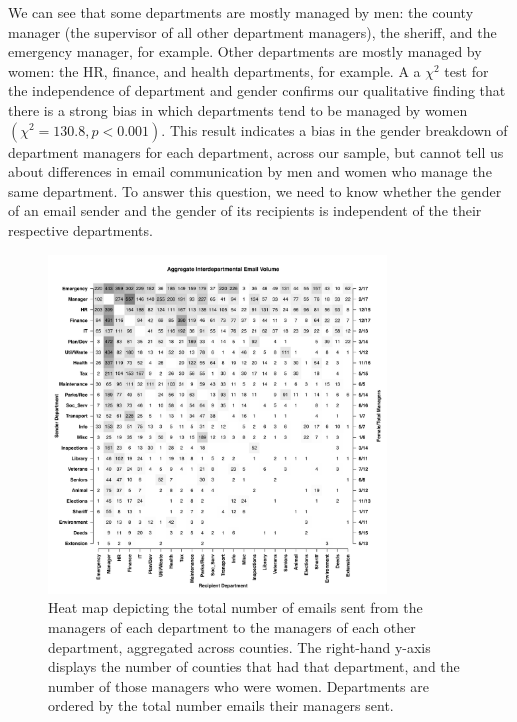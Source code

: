 \documentclass{pnastwo}
\begin{document}
\begin{article}
\begin{table}
	\end{table}
	\setlength{\tabcolsep}{6pt}
	
	
We can see that some departments are mostly managed by men: the county manager (the supervisor of all other department managers), the sheriff, and the emergency manager, for example. Other departments  are mostly managed by women: the HR, finance, and health departments, for example. A a $\chi^2$ test for the independence of department and gender confirms our qualitative finding that there is a strong bias in which departments tend to be managed by women $(\chi^2 = 130.8, p < 0.001)$. This result indicates a bias in the gender breakdown of department managers for each department, across our sample, but cannot tell us about differences in email communication by men and women who manage the same department. To answer this question, we need to know whether the gender of an email sender and the gender of its recipients is independent of the their respective departments. 
	
	\begin{figure}
	\centering
	\includegraphics[width = 0.8\textwidth]{images/Aggregate_Email_Flows.pdf}
	\caption{\label{fig:heatmaps}Heat map depicting the total number of emails sent from the managers of each department to the managers of each other department, aggregated across counties. The right-hand y-axis displays the number of counties that had that department, and the number of those managers who were women. Departments are ordered by the total number emails their managers sent.}
	\end{figure}


\end{article}
\end{document}
